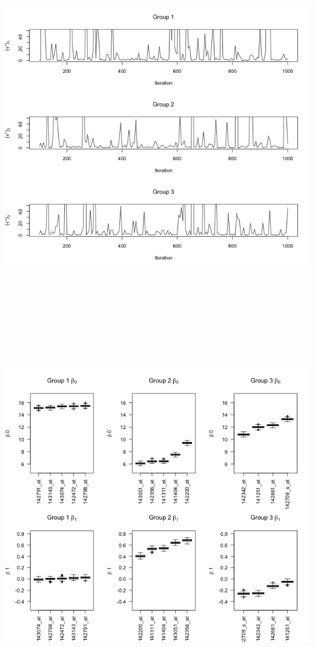 \documentclass[12pt,letterpaper]{article}\usepackage[]{graphicx}\usepackage[]{color}
\begin{document}
\includegraphics[width=14cm, height=20cm,keepaspectratio]
  {genes-groupshrink-taus.png}\\
\includegraphics[width=\textwidth]
  {genes-groupshrink-betas.png}\\
\end{document}
